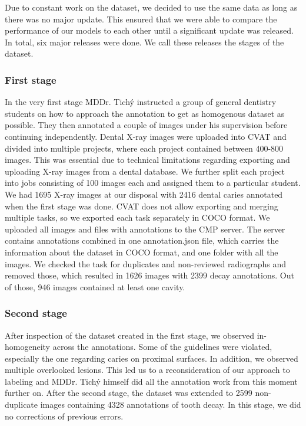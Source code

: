 Due to constant work on the dataset, we decided to use the same data as long as there was no major update. This ensured that we were able to compare the performance of our models to each other until a significant update was released. In total, six major releases were done. We call these releases the stages of the dataset.

\subsubsection{First stage}
In the very first stage MDDr. Tichý instructed a group of general dentistry students on how to approach the annotation to get as homogenous dataset as possible. They then annotated a couple of images under his supervision before continuing independently.
Dental X-ray images were uploaded into CVAT and divided into multiple projects, where each project contained between 400-800 images. This was essential due to technical limitations regarding exporting and uploading X-ray images from a dental database. We further split each project into jobs consisting of 100 images each and assigned them to a particular student. We had 1695 X-ray images at our disposal with 2416 dental caries annotated when the first stage was done.
CVAT does not allow exporting and merging multiple tasks, so we exported each task separately in COCO format. We uploaded all images and files with annotations  to the CMP server. The server contains annotations combined in one annotation.json file, which carries the information about the dataset in COCO format, and one folder with all the images. We checked the task for duplicates and non-reviewed radiographs and removed those, which resulted in 1626 images with 2399 decay annotations. Out of those, 946 images contained at least one cavity.


\subsubsection{Second stage}
After inspection of the dataset created in the first stage, we observed in-homogeneity across the annotations. Some of the guidelines were violated, especially the one regarding caries on proximal surfaces. In addition, we observed multiple overlooked lesions. This led us to a reconsideration of our approach to labeling and MDDr. Tichý himself did all the annotation work from this moment further on. After the second stage, the dataset was extended to 2599 non-duplicate images containing 4328 annotations of tooth decay. In this stage, we did no corrections of previous errors.

